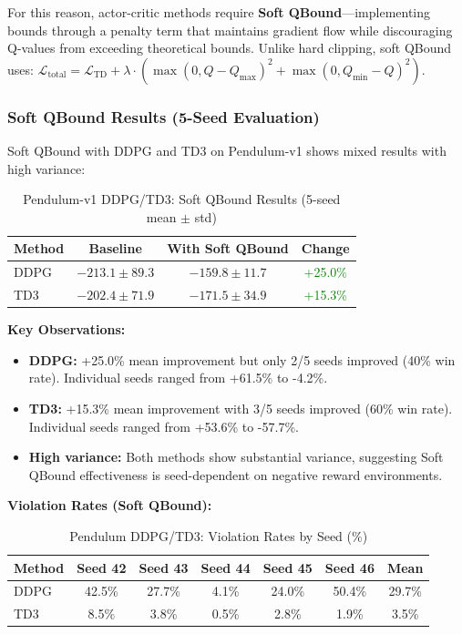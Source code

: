 \documentclass[11pt]{article}
\theoremstyle{definition}
\theoremstyle{remark}
\begin{document}
For this reason, actor-critic methods require \textbf{Soft QBound}—implementing bounds through a penalty term that maintains gradient flow while discouraging Q-values from exceeding theoretical bounds. Unlike hard clipping, soft QBound uses: $\mathcal{L}_{\text{total}} = \mathcal{L}_{\text{TD}} + \lambda \cdot (\max(0, Q-Q_{\max})^2 + \max(0, Q_{\min}-Q)^2)$.

\subsubsection{Soft QBound Results (5-Seed Evaluation)}

Soft QBound with DDPG and TD3 on Pendulum-v1 shows mixed results with high variance:

\begin{table}[H]
\centering
\caption{Pendulum-v1 DDPG/TD3: Soft QBound Results (5-seed mean $\pm$ std)}
\small
\begin{tabular}{@{}lccc@{}}
\toprule
\textbf{Method} & \textbf{Baseline} & \textbf{With Soft QBound} & \textbf{Change} \\
\midrule
DDPG & $-213.1 \pm 89.3$ & $-159.8 \pm 11.7$ & \textcolor{green}{+25.0\%} \\
TD3 & $-202.4 \pm 71.9$ & $-171.5 \pm 34.9$ & \textcolor{green}{+15.3\%} \\
\bottomrule
\end{tabular}
\end{table}

\textbf{Key Observations:}
\begin{itemize}
    \item \textbf{DDPG:} +25.0\% mean improvement but only 2/5 seeds improved (40\% win rate). Individual seeds ranged from +61.5\% to -4.2\%.
    \item \textbf{TD3:} +15.3\% mean improvement with 3/5 seeds improved (60\% win rate). Individual seeds ranged from +53.6\% to -57.7\%.
    \item \textbf{High variance:} Both methods show substantial variance, suggesting Soft QBound effectiveness is seed-dependent on negative reward environments.
\end{itemize}

\textbf{Violation Rates (Soft QBound):}

\begin{table}[H]
\centering
\caption{Pendulum DDPG/TD3: Violation Rates by Seed (\%)}
\small
\begin{tabular}{@{}lccccc|c@{}}
\toprule
\textbf{Method} & \textbf{Seed 42} & \textbf{Seed 43} & \textbf{Seed 44} & \textbf{Seed 45} & \textbf{Seed 46} & \textbf{Mean} \\
\midrule
DDPG & 42.5\% & 27.7\% & 4.1\% & 24.0\% & 50.4\% & 29.7\% \\
TD3 & 8.5\% & 3.8\% & 0.5\% & 2.8\% & 1.9\% & 3.5\% \\
\bottomrule
\end{tabular}
\end{table}
\end{document}
